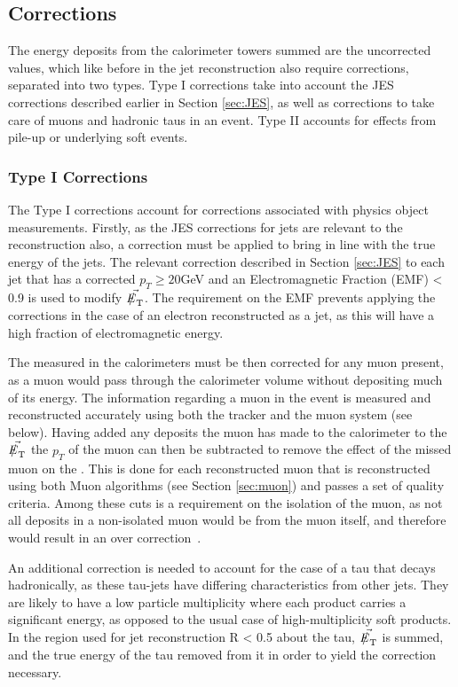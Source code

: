 \subsection{\met Corrections}

The energy deposits from the calorimeter towers summed are the uncorrected values, which like before in the jet reconstruction also require corrections, separated into two types. Type I corrections take into account the JES  corrections described earlier in Section \ref{sec:JES}, as well as corrections to take care of muons and hadronic taus in an event. Type II  accounts for effects from pile-up or underlying soft events.
 
\subsubsection{Type I Corrections}
The Type I corrections account for corrections associated with physics object measurements. Firstly, as the JES corrections for jets are relevant to the \met reconstruction also, a correction must be applied to bring \met in line with the true energy of the jets. The relevant correction described in Section \ref{sec:JES} to each jet that has a corrected $p_{T} \geq 20 $GeV and an Electromagnetic Fraction (EMF) < 0.9 is used to modify $\vec{\met}$. The requirement on the EMF prevents applying the corrections in the case of an electron reconstructed as a jet, as this will have a high fraction of electromagnetic  energy.

The \met measured in the calorimeters must be then corrected for any muon present, as a muon would pass through the calorimeter volume without depositing much of its energy. The information regarding a muon in the event is measured and reconstructed accurately using both the tracker and the muon system (see below). Having added any deposits the muon has made to the calorimeter to the $\vec{\met}$ the $p_{T}$ of the muon can then be subtracted to remove the effect of the missed muon on the \met. This is done for each reconstructed muon that is reconstructed using both Muon algorithms (see Section \ref{sec:muon}) and passes a set of quality criteria. Among these cuts is a requirement on the isolation of the muon, as not all deposits in a non-isolated muon would be from the muon itself, and therefore would result in an over correction~\cite{etmissnote}. 

An additional correction is needed to account for the case of a tau that decays hadronically, as these tau-jets have differing characteristics from other jets. They are likely to have a low particle multiplicity where each product carries a significant energy, as opposed to the usual case of high-multiplicity soft products. In the region used for jet reconstruction R < 0.5 about the tau, $\vec{\met}$ is summed, and the true energy of the tau removed from it in order to yield the correction necessary.  

